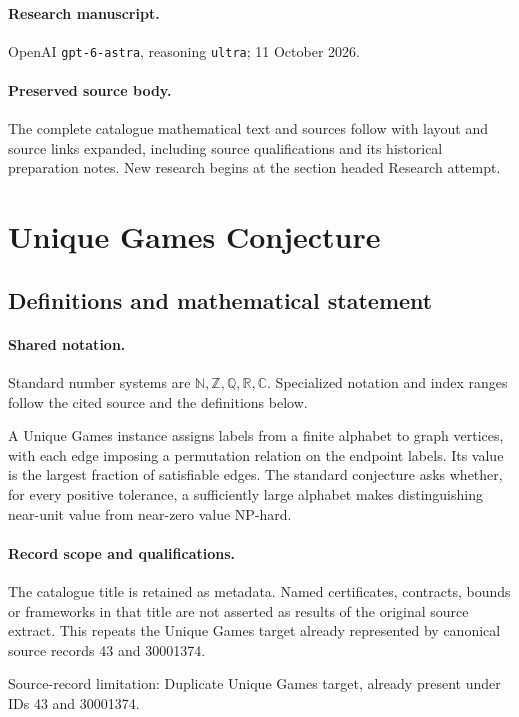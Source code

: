 \documentclass[11pt]{article}
\begin{document}
\paragraph{Research manuscript.} OpenAI \texttt{gpt-6-astra}, reasoning \texttt{ultra}; 11 October 2026.
\paragraph{Preserved source body.} The complete catalogue mathematical text and sources follow with layout and source links expanded, including source qualifications and its historical preparation notes. New research begins at the section headed Research attempt.

\section{Unique Games Conjecture}\label{statement}

\subsection{Definitions and mathematical statement}

\paragraph{Shared notation.}Standard number systems are $\mathbb N,\mathbb Z,\mathbb Q,\mathbb R,\mathbb C$. Specialized notation and index ranges follow the cited source and the definitions below.


A Unique Games instance assigns labels from a finite alphabet to graph vertices, with each edge imposing a permutation relation on the endpoint labels. Its value is the largest fraction of satisfiable edges. The standard conjecture asks whether, for every positive tolerance, a sufficiently large alphabet makes distinguishing near-unit value from near-zero value NP-hard.
\paragraph{Record scope and qualifications.}
The catalogue title is retained as metadata. Named certificates, contracts, bounds or frameworks in that title are not asserted as results of the original source extract.
This repeats the Unique Games target already represented by canonical source records 43 and 30001374.

Source-record limitation: Duplicate Unique Games target, already present under IDs 43 and 30001374.
\end{document}
